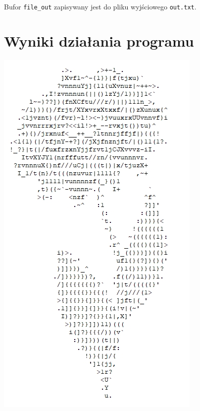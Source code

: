 \documentclass[polish, 11pt]{article}
\begin{document}
    Bufor \verb|file_out| zapisywany jest do pliku wyjściowego \verb|out.txt|.
    
    

\section{Wyniki działania programu}
    \begin{minipage}[t]{.33\textwidth}
        \includegraphics[width=\textwidth]{kwiatek8.jpg}
    \end{minipage}%
\end{document}
